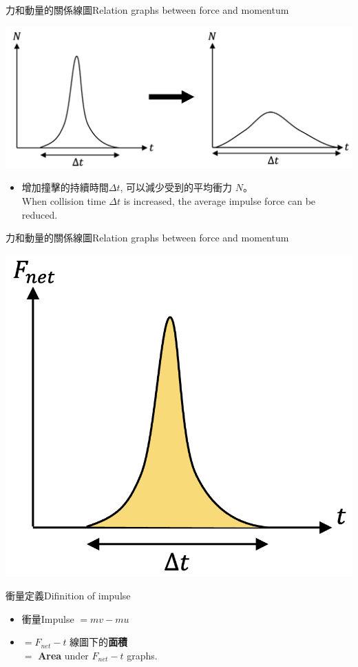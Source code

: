 \documentclass[13pt]{beamer}
\begin{document}
\begin{frame}{力和動量的關係線圖Relation graphs between force and momentum}
    \par{\par\centering
        \includegraphics[width=.8\textwidth]{assets/76cc933c.png}
        \par}\bigskip
    \begin{itemize}
        \item 增加撞擊的持續時間$\Delta t$, 可以減少受到的平均衝力 $N$。\\When collision time $\Delta t$ is increased, the average impulse force can be reduced.
    \end{itemize}
\end{frame}

\begin{frame}{力和動量的關係線圖Relation graphs between force and momentum}
    \par{\par\centering
        \includegraphics[width=.3\textwidth]{assets/99524ca7.png}
        \par}
    \begin{alertblock}
        {衝量定義Difinition of impulse}
        \begin{itemize}
            \item 衝量Impulse $=mv-mu$
            \item []$=F_{net}-t$ 線圖下的\textbf{面積}\\$=$ \textbf{Area} under $F_{net}-t$ graphs.
        \end{itemize}
    \end{alertblock}

\end{frame}
\end{document}
